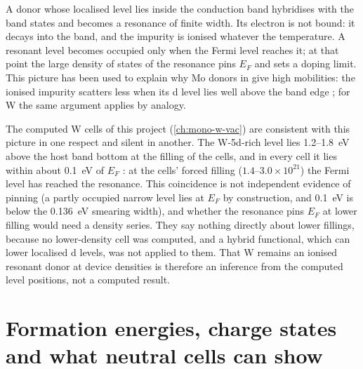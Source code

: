 A donor whose localised level lies inside the conduction band hybridises with the band states and becomes a resonance
of finite width. Its electron is not bound: it decays into the band, and the impurity is ionised whatever the
temperature. A resonant level becomes occupied only when the Fermi level reaches it; at that point the large density of
states of the resonance pins $E_F$ and sets a doping limit. This picture has been used to explain why Mo donors in \InO{} give high mobilities: the ionised impurity scatters
less when its d level lies well above the band edge \citep{Swallow2020}; for W the same argument applies by analogy.

The computed W cells of this project (\cref{ch:mono-w-vac}) are consistent with this picture in one respect and silent
in another. The W-5d-rich level lies 1.2--1.8~eV above the host band bottom at the filling of the cells, and in every
cell it lies within about 0.1~eV of $E_F$ : at the cells' forced filling ($1.4$--$3.0\times10^{21}$\cmcu{}) the Fermi
level has reached the resonance. This coincidence is not independent evidence of pinning (a partly occupied narrow level
lies at $E_F$ by construction, and 0.1~eV is below the 0.136~eV smearing width), and whether the resonance pins $E_F$ at
lower filling would need a density series. They say nothing directly about lower fillings, because no lower-density cell was computed, and a hybrid
functional, which can lower localised d levels, was not applied to them. That W remains an ionised resonant donor at
device densities is therefore an inference from the computed level positions, not a computed result.

\section{Formation energies, charge states and what neutral cells can show}
\label{sec:mono-defect-formation}

